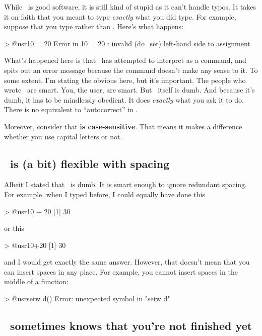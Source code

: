 While \R\ is good software, it is still kind of stupid as it can't handle typos. It takes it on faith that you meant to type {\it exactly} what you did type. For example, suppose that you type  rather than . Here's what happens:
\begin{rblock1}
> @usr{10 = 20}
Error in 10 = 20 : invalid (do_set) left-hand side to assignment
\end{rblock1}
What's happened here is that \R\ has attempted to interpret  as a command, and spits out an error message because the command doesn't make any sense to it. 
To some extent, I'm stating the obvious here, but it's important. The people who wrote \R\ are smart. You, the user, are smart. But \R\ itself is dumb. And because it's dumb, it has to be mindlessly obedient. It does {\it exactly} what you ask it to do. There is  no equivalent to ``autocorrect'' in \R. 

Moreover, consider that \textbf{\R is case-sensitive}. That means it makes a difference whether you use capital letters or not.

\subsection{\R\ is (a bit) flexible with spacing}

Albeit I stated that \R\ is dumb. It is smart enough to ignore redundant spacing. For example,  when I typed  before, I could equally have done this
\begin{rblock1}
> @usr{10    + 20}
[1] 30
\end{rblock1}
or this 
\begin{rblock1}
> @usr{10+20}
[1] 30
\end{rblock1}
and I would get exactly the same answer. However, that doesn't mean that you can insert spaces in any place. For example, you cannot insert spaces in the middle of a function:
\begin{rblock1}
> @usr{setw d()}
Error: unexpected symbol in "setw d"
\end{rblock1}


\subsection{\R\ sometimes knows that you're not finished yet}

